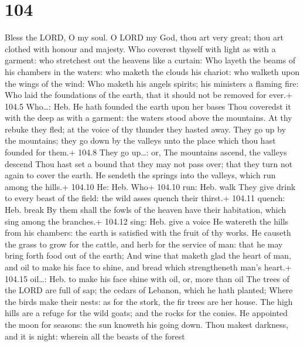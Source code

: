 \hypertarget{section-103}{%
\section{104}\label{section-103}}

 Bless the LORD, O my soul. O LORD my God, thou art very
great; thou art clothed with honour and majesty.  Who
coverest thyself with light as with a garment: who stretchest out the
heavens like a curtain:  Who layeth the beams of his
chambers in the waters: who maketh the clouds his chariot: who walketh
upon the wings of the wind:  Who maketh his angels spirits;
his ministers a flaming fire:  Who laid the foundations of
the earth, that it should not be removed for ever.+ 104.5 Who\ldots:
Heb. He hath founded the earth upon her bases  Thou
coveredst it with the deep as with a garment: the waters stood above the
mountains.  At thy rebuke they fled; at the voice of thy
thunder they hasted away.  They go up by the mountains; they
go down by the valleys unto the place which thou hast founded for them.+
104.8 They go up\ldots: or, The mountains ascend, the valleys descend
 Thou hast set a bound that they may not pass over; that
they turn not again to cover the earth.  He sendeth the
springs into the valleys, which run among the hills.+ 104.10 He: Heb.
Who+ 104.10 run: Heb. walk  They give drink to every beast
of the field: the wild asses quench their thirst.+ 104.11 quench: Heb.
break  By them shall the fowls of the heaven have their
habitation, which sing among the branches.+ 104.12 sing: Heb. give a
voice  He watereth the hills from his chambers: the earth
is satisfied with the fruit of thy works.  He causeth the
grass to grow for the cattle, and herb for the service of man: that he
may bring forth food out of the earth;  And wine that
maketh glad the heart of man, and oil to make his face to shine, and
bread which strengtheneth man's heart.+ 104.15 oil\ldots: Heb. to make
his face shine with oil, or, more than oil  The trees of
the LORD are full of sap; the cedars of Lebanon, which he hath planted;
 Where the birds make their nests: as for the stork, the
fir trees are her house.  The high hills are a refuge for
the wild goats; and the rocks for the conies.  He appointed
the moon for seasons: the sun knoweth his going down.  Thou
makest darkness, and it is night: wherein all the beasts of the forest
